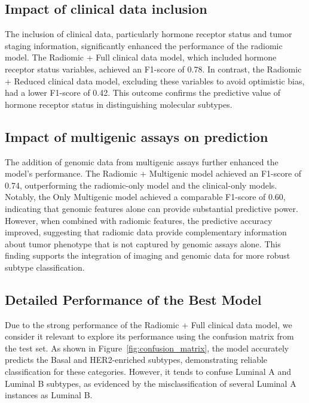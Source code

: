 \documentclass[conference]{IEEEtran}
\begin{document}
\subsection{Impact of clinical data inclusion}

The inclusion of clinical data, particularly hormone receptor status and tumor staging information, significantly enhanced the performance of the radiomic model. The Radiomic + Full clinical data model, which included hormone receptor status variables, achieved an F1-score of 0.78. In contrast, the Radiomic + Reduced clinical data model, excluding these variables to avoid optimistic bias, had a lower F1-score of 0.42. This outcome confirms the predictive value of hormone receptor status in distinguishing molecular subtypes.

\subsection{Impact of multigenic assays on prediction}

The addition of genomic data from multigenic assays further enhanced the model’s performance. The Radiomic + Multigenic model achieved an F1-score of 0.74, outperforming the radiomic-only model and the clinical-only models. Notably, the Only Multigenic model achieved a comparable F1-score of 0.60, indicating that genomic features alone can provide substantial predictive power. However, when combined with radiomic features, the predictive accuracy improved, suggesting that radiomic data provide complementary information about tumor phenotype that is not captured by genomic assays alone. This finding supports the integration of imaging and genomic data for more robust subtype classification.

\subsection{Detailed Performance of the Best Model}

Due to the strong performance of the Radiomic + Full clinical data model, we consider it relevant to explore its performance using the confusion matrix from the test set. As shown in Figure~\ref{fig:confusion_matrix}, the model accurately predicts the Basal and HER2-enriched subtypes, demonstrating reliable classification for these categories. However, it tends to confuse Luminal A and Luminal B subtypes, as evidenced by the misclassification of several Luminal A instances as Luminal B.
\end{document}
